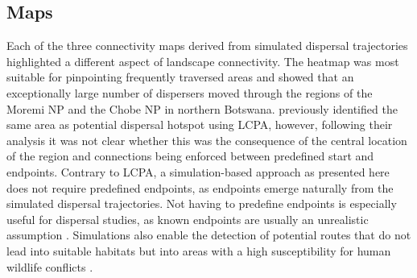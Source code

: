 \documentclass[abstract=on,10pt,a4paper,bibliography=totocnumbered]{article}
\begin{document}
\subsection{Maps}
Each of the three connectivity maps derived from simulated dispersal
trajectories highlighted a different aspect of landscape connectivity. The
heatmap was most suitable for pinpointing frequently traversed areas and showed
that an exceptionally large number of dispersers moved through the regions of
the Moremi NP and the Chobe NP in northern Botswana. \cite{Hofmann.2021}
previously identified the same area as potential dispersal hotspot using LCPA,
however, following their analysis it was not clear whether this was the
consequence of the central location of the region and connections being enforced
between predefined start and endpoints. Contrary to LCPA, a simulation-based
approach as presented here does not require predefined endpoints, as endpoints
emerge naturally from the simulated dispersal trajectories. Not having to
predefine endpoints is especially useful for dispersal studies, as known
endpoints are usually an unrealistic assumption \citep{Elliot.2014,
Abrahms.2017, Cozzi.2020}. Simulations also enable the detection of potential
routes that do not lead into suitable habitats \citep{Dwernychuk.1972,
VanDerMeer.2014} but into areas with a high susceptibility for human wildlife
conflicts \citep{Cushman.2018}.
\end{document}
